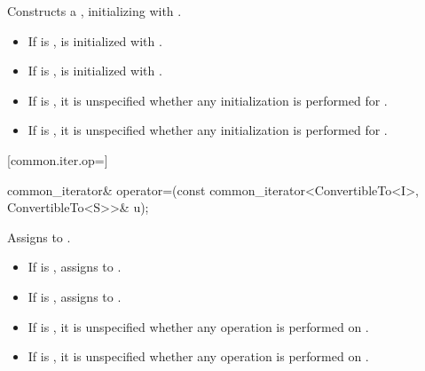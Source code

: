 \begin{itemdescr}
\pnum
\effects Constructs a , initializing
 with .
\begin{itemize}
\item If  is ,  is initialized with .
\item If  is ,  is initialized with .
\end{itemize}

\pnum
\remarks
\begin{itemize}
\item If  is , it is unspecified whether any initialization
is performed for .
\item If  is , it is unspecified whether any initialization
is performed for .
\end{itemize}
\end{itemdescr}

[common.iter.op=]{}

%
%
\begin{itemdecl}
common_iterator& operator=(const common_iterator<ConvertibleTo<I>, ConvertibleTo<S>>& u);
\end{itemdecl}

\begin{itemdescr}
\pnum
\effects Assigns  to .
\begin{itemize}
\item If  is , assigns  to .
\item If  is , assigns  to .
\end{itemize}

\remarks
\begin{itemize}
\item If  is , it is unspecified whether any operation
is performed on .
\item If  is , it is unspecified whether any operation
is performed on .
\end{itemize}

\pnum
\returns {}
\end{itemdescr}

